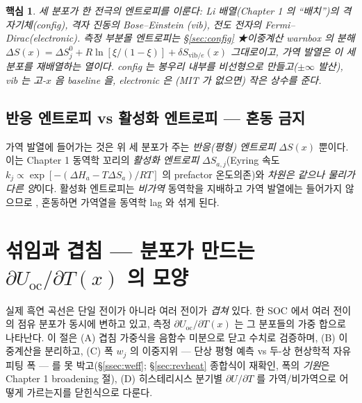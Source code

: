 \documentclass[11pt,a4paper]{article}
\newtheorem*{keybox}{핵심}
\newcommand{\oc}{\mathrm{oc}}
\newcommand{\vib}{\mathrm{vib}}
\begin{document}
\begin{keybox}
세 분포가 한 전극의 엔트로피를 이룬다: Li 배열(Chapter 1 의 ``배치'')의 \emph{격자기체}(config), 격자 진동의 \emph{Bose--Einstein}
(vib), 전도 전자의 \emph{Fermi--Dirac}(electronic). 측정 부분몰 엔트로피는 \S\ref{sec:config} ★이중계산
warnbox 의 분해 $\Delta S(x)=\Delta S^0_j+R\ln[\xi/(1-\xi)]+\delta S_{\vib/e}(x)$ 그대로이고, 가역 발열은 이 세 분포를
재배열하는 열이다. config 는 봉우리 \emph{내부}를 비선형으로 만들고($\pm\infty$ 발산), vib 는 고-$x$ 음
baseline 을, electronic 은 (MIT 가 없으면) 작은 상수를 준다.
\end{keybox}

\subsection{반응 엔트로피 vs 활성화 엔트로피 — 혼동 금지}
가역 발열에 들어가는 것은 위 세 분포가 주는 \emph{반응(평형) 엔트로피} $\Delta S(x)$ 뿐이다. 이는 Chapter 1
동역학 꼬리의 \emph{활성화 엔트로피} $\Delta S_{a,j}$(Eyring 속도 $k_j\propto\exp[-(\Delta H_a-T\Delta S_a)/RT]$
의 prefactor 온도의존)와 \emph{차원은 같으나 물리가 다른 양}이다. 활성화 엔트로피는 \emph{비가역} 동역학을
지배하고 가역 발열에는 들어가지 않으므로 \cite{msmr_partI}, 혼동하면 가역열을 동역학 lag 와 섞게 된다.

\section{섞임과 겹침 — 분포가 만드는 $\partial U_\oc/\partial T(x)$ 의 모양}\label{sec:mixing}
실제 흑연 곡선은 단일 전이가 아니라 여러 전이가 \emph{겹쳐} 있다. 한 SOC 에서 여러 전이의 점유 분포가 동시에
변하고 있고, 측정 $\partial U_\oc/\partial T(x)$ 는 그 분포들의 가중 합으로 나타난다. 이 절은 (A) 겹침 가중식을
음함수 미분으로 닫고 수치로 검증하며, (B) 이중계산을 분리하고, (C) 폭 $w_j$ 의 이중지위 — 단상 평형 예측 vs
두-상 현상학적 자유 피팅 폭 — 를 못 박고(\S\ref{ssec:weff}; \S\ref{sec:revheat} 종합식이 재확인, 폭의
\emph{기원}은 Chapter 1 broadening 절), (D) 히스테리시스 분기별 $\partial U/\partial T$ 를
가역/비가역으로 어떻게 가르는지를 닫힌식으로 다룬다.
\end{document}
